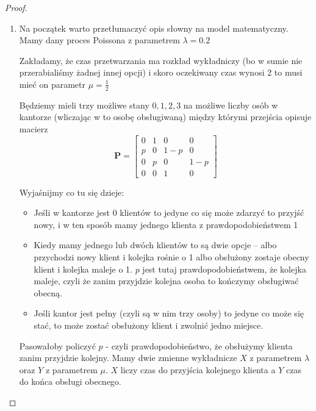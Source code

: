 \begin{proof} \( \)
	\begin{enumerate}
		\item
		      Na początek warto przetłumaczyć opis słowny na model matematyczny.
		      Mamy dany proces Poissona z parametrem \( \lambda = 0.2 \)

		      Zakładamy, że czas przetwarzania ma rozkład wykładniczy (bo w sumie nie przerabialiśmy żadnej innej opcji)
		      i skoro oczekiwany czas wynosi 2 to musi mieć on parametr \( \mu = \frac{1}{2} \)


		      Będziemy mieli trzy możliwe stany \( 0, 1, 2, 3 \) na możliwe liczby osób w kantorze (wliczając w to osobę obsługiwaną) między którymi przejścia
		      opisuje macierz
		      \[
			      \mathbf{P} = \begin{bmatrix}
				      0 & 1 & 0     & 0     \\
				      p & 0 & 1 - p & 0     \\
				      0 & p & 0     & 1 - p \\
				      0 & 0 & 1     & 0
			      \end{bmatrix}
		      \]

		      Wyjaśnijmy co tu się dzieje:
		      \begin{itemize}
			      \item Jeśli w kantorze jest 0 klientów to jedyne co się
			            może zdarzyć to przyjść nowy, i w ten sposób mamy jednego klienta z prawdopodobieństwem 1

			      \item Kiedy mamy jednego lub dwóch klientów to są dwie opcje -- albo przychodzi nowy klient i kolejka rośnie o 1 albo obsłużony zostaje obecny klient i kolejka maleje o 1.
			            \( p \) jest tutaj prawdopodobieństwem, że kolejka maleje, czyli że zanim przyjdzie kolejna osoba to kończymy obsługiwać obecną.

			      \item Jeśli kantor jest pełny (czyli są w nim trzy osoby) to jedyne co może się stać, to może zostać obsłużony klient i zwolnić jedno miejsce.
		      \end{itemize}

		      Pasowałoby policzyć \( p \) - czyli prawdopodobieństwo, że obsłużymy klienta zanim przyjdzie kolejny.
		      Mamy dwie zmienne wykładnicze \( X \) z parametrem \(\lambda\) oraz \( Y \) z parametrem \( \mu \). \( X \) liczy czas do przyjścia kolejnego klienta a \( Y \) czas do końca obsługi obecnego.


\end{enumerate}
\end{proof}
